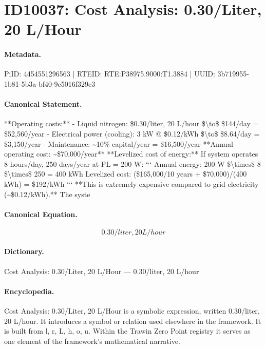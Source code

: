\section*{ID10037: Cost Analysis: 0.30/Liter, 20 L/Hour}
\paragraph{Metadata.}
PiID: 4454551296563 | RTEID: RTE:P38975.9000:T1.3884 | UUID: 3b719955-1b81-5b3a-bf40-9c5016f329e3

\paragraph{Canonical Statement.}
**Operating costs:** - Liquid nitrogen: \$0.30/liter, 20 L/hour \$\textbackslash{}to\$ \$144/day = \$52,560/year - Electrical power (cooling): 3 kW @ \$0.12/kWh \$\textbackslash{}to\$ \$8.64/day = \$3,150/year - Maintenance: \textasciitilde{}10\% capital/year = \$16,500/year **Annual operating cost: \textasciitilde{}\$70,000/year** **Levelized cost of energy:** If system operates 8 hours/day, 250 days/year at PL = 200 W: ``` Annual energy: 200 W \$\textbackslash{}times\$ 8 \$\textbackslash{}times\$ 250 = 400 kWh Levelized cost: (\$165,000/10 years + \$70,000)/(400 kWh) = \$192/kWh ``` **This is extremely expensive compared to grid electricity (\textasciitilde{}\$0.12/kWh).** The syste

\paragraph{Canonical Equation.}
\[
0.30/liter, 20 L/hour
\]

\paragraph{Dictionary.}
Cost Analysis: 0.30/Liter, 20 L/Hour — 0.30/liter, 20 L/hour

\paragraph{Encyclopedia.}
Cost Analysis: 0.30/Liter, 20 L/Hour is a symbolic expression, written 0.30/liter, 20 L/hour. It introduces a symbol or relation used elsewhere in the framework. It is built from l, r, L, h, o, u. Within the Trawin Zero Point registry it serves as one element of the framework's mathematical narrative.
